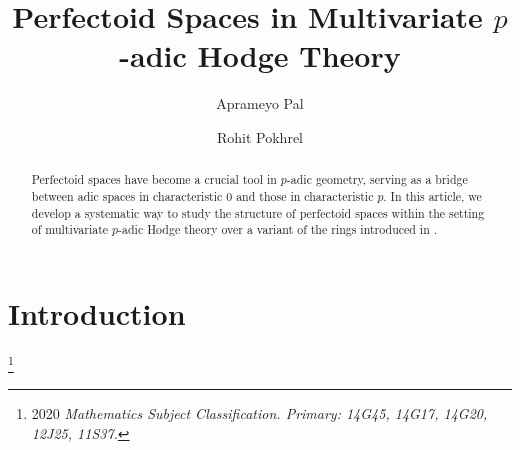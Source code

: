 \documentclass[12pts,a4paper]{amsart}
\begin{document}
	\title{Perfectoid Spaces in Multivariate $p$-adic Hodge Theory}

          \author{Aprameyo Pal}
	\address{(Aprameyo Pal) Harish-Chandra Research Institute, A CI of Homi Bhabha National Institute, Chhatnag Road, Jhunsi, Prayagraj - 211019, India}

      		\author{Rohit Pokhrel} 
	\address{(Rohit Pokhrel) Harish-Chandra Research Institute, A CI of Homi Bhabha National Institute, Chhatnag Road, Jhunsi, Prayagraj - 211019, India}
	
	\maketitle

\begin{abstract}
Perfectoid spaces have become a crucial tool in $p$-adic geometry, serving as a bridge between adic spaces in characteristic $0$ and those in characteristic $p$. In this article, we develop a systematic way to study the structure of perfectoid spaces within the setting of multivariate $p$-adic Hodge theory over a variant of the rings introduced in \cite{Bri}.
\end{abstract}
 
\tableofcontents
	
\section{Introduction}
\footnote{2020 \it Mathematics Subject Classification. 
\rm Primary: 14G45, 14G17, 14G20, 12J25, 11S37.}
\end{document}
